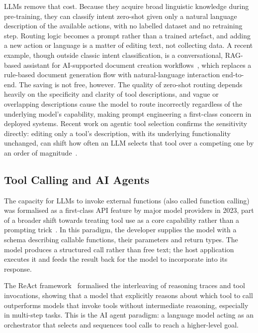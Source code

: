 LLMs remove that cost. Because they acquire broad linguistic knowledge during pre-training, they can classify intent zero-shot given only a natural language description of the available actions, with no labelled dataset and no retraining step. Routing logic becomes a prompt rather than a trained artefact, and adding a new action or language is a matter of editing text, not collecting data. A recent example, though outside classic intent classification, is a conversational, RAG-based assistant for AI-supported document creation workflows~\cite{dalia2025workflow}, which replaces a rule-based document generation flow with natural-language interaction end-to-end. The saving is not free, however. The quality of zero-shot routing depends heavily on the specificity and clarity of tool descriptions, and vague or overlapping descriptions cause the model to route incorrectly regardless of the underlying model's capability, making prompt engineering a first-class concern in deployed systems. Recent work on agentic tool selection confirms the sensitivity directly: editing only a tool's description, with its underlying functionality unchanged, can shift how often an LLM selects that tool over a competing one by an order of magnitude~\cite{faghih2025toolpreferences}.

\subsection{Tool Calling and AI Agents}
\label{subsec:background_tool_calling}

The capacity for LLMs to invoke external functions (also called function calling) was formalised as a first-class API feature by major model providers in 2023, part of a broader shift towards treating tool use as a core capability rather than a prompting trick~\cite{qu2024toollearning}. In this paradigm, the developer supplies the model with a schema describing callable functions, their parameters and return types. The model produces a structured call rather than free text; the host application executes it and feeds the result back for the model to incorporate into its response.

The ReAct framework~\cite{yao2023react} formalised the interleaving of reasoning traces and tool invocations, showing that a model that explicitly reasons about which tool to call outperforms models that invoke tools without intermediate reasoning, especially in multi-step tasks. This is the AI agent paradigm: a language model acting as an orchestrator that selects and sequences tool calls to reach a higher-level goal.

